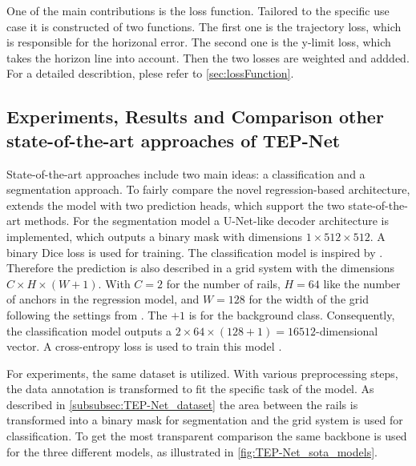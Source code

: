 One of the main contributions is the loss function.
Tailored to the specific use case it is constructed of two functions.
The first one is the trajectory loss, which is responsible for the horizonal error.
The second one is the y-limit loss, which takes the horizon line into account.
Then the two losses are weighted and addded.
For a detailed describtion, plese refer to \autoref{sec:lossFunction}.

\subsection{Experiments, Results and Comparison other state-of-the-art approaches of TEP-Net}

State-of-the-art approaches include two main ideas: a classification and a segmentation approach.
To fairly compare the novel regression-based architecture, \cite{tepNet2024} extends the model with two prediction heads, which support the two state-of-the-art methods.
For the segmentation model a U-Net-like \cite{uNet2015} decoder architecture is implemented, which outputs a binary mask with dimensions $1 \times 512 \times 512$.
A binary Dice loss is used for training.
The classification model is inspired by \cite{li2022rail}.
Therefore the prediction is also described in a grid system with the dimensions $C \times H \times (W + 1)$.
With $C=2$ for the number of rails, $H=64$ like the number of anchors in the regression model, and $W=128$ for the width of the grid following the settings from \cite{li2022rail}.
The $+1$ is for the background class.
Consequently, the classification model outputs a $2 \times 64 \times (128 + 1) = 16512$-dimensional vector.
A cross-entropy loss is used to train this model \cite{tepNet2024}.

For experiments, the same dataset is utilized.
With various preprocessing steps, the data annotation is transformed to fit the specific task of the model.
As described in \autoref{subsubsec:TEP-Net_dataset} the area between the rails is transformed into a binary mask for segmentation and the grid system is used for classification.
To get the most transparent comparison the same backbone is used for the three different models, as illustrated in \autoref{fig:TEP-Net_sota_models}.


